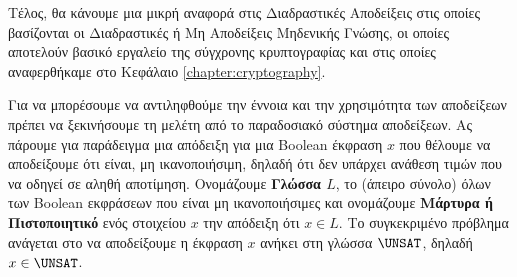 Τέλος, θα κάνουμε μια μικρή αναφορά στις Διαδραστικές Αποδείξεις στις οποίες βασίζονται οι Διαδραστικές ή Μη Αποδείξεις Μηδενικής Γνώσης, οι οποίες αποτελούν βασικό εργαλείο της σύγχρονης κρυπτογραφίας και στις οποίες αναφερθήκαμε στο Κεφάλαιο \ref{chapter:cryptography}.

Για να μπορέσουμε να αντιληφθούμε την έννοια και την χρησιμότητα των αποδείξεων πρέπει να ξεκινήσουμε τη μελέτη από το παραδοσιακό σύστημα αποδείξεων.  Ας πάρουμε για παράδειγμα μια απόδειξη για μια Boolean έκφραση $x$ που θέλουμε να αποδείξουμε ότι είναι, μη ικανοποιήσιμη, δηλαδή ότι δεν υπάρχει ανάθεση τιμών που να οδηγεί σε αληθή αποτίμηση. Ονομάζουμε \textbf{Γλώσσα $L$}, το (άπειρο σύνολο) όλων των Boolean εκφράσεων που είναι μη ικανοποιήσιμες και ονομάζουμε \textbf{Μάρτυρα ή Πιστοποιητικό} ενός στοιχείου $x$ την απόδειξη ότι $x \in L$. Το συγκεκριμένο πρόβλημα ανάγεται στο να αποδείξουμε η έκφραση $x$ ανήκει στη γλώσσα $\UNSAT$, δηλαδή $x \in \UNSAT$.
